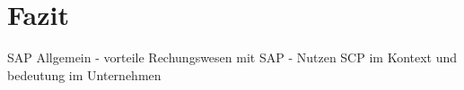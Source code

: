 \section{Fazit}
SAP Allgemein - vorteile
Rechungswesen mit SAP - Nutzen
SCP im Kontext und bedeutung im Unternehmen